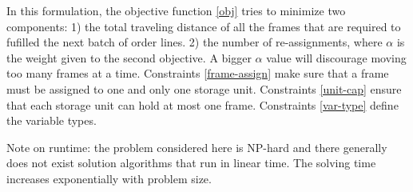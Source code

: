 \documentclass[a4, 11pt]{article}
\begin{document}
In this formulation, the objective function \eqref{obj} tries to minimize two components: 1) the total traveling distance of all the frames that are required to fufilled the next batch of order lines. 2) the number of re-assignments, where $\alpha$ is the weight given to the second objective.
A bigger $\alpha$ value will discourage moving too many frames at a time.
Constraints \eqref{frame-assign} make sure that a frame must be assigned to one and only one storage unit.
Constraints \eqref{unit-cap} ensure that each storage unit can hold at most one frame.
Constraints \eqref{var-type} define the variable types.


Note on runtime: the problem considered here is NP-hard and there generally does not exist solution algorithms that run in linear time. The solving time increases exponentially with problem size.
	
\end{document}
